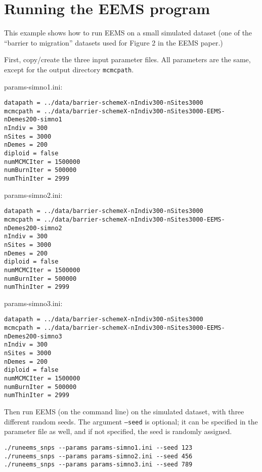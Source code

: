 \documentclass[a4paper,10pt,DIV=15,titlepage,mpinclude=true]{scrartcl}
\newcommand{\keystring}[1]{{\tt #1}}
\begin{document}
\newpage 

\section{Running the EEMS program}\label{sec:running-eems}

This example shows how to run EEMS on a small simulated dataset (one of the ``barrier to migration'' datasets used for Figure 2 in the EEMS paper.)

First, copy/create the three input parameter files. All parameters are the same, except for the output directory \keystring{mcmcpath}.

\bigskip

\noindent params-simno1.ini:
\begin{lstlisting}[style=Cppcode]
datapath = ../data/barrier-schemeX-nIndiv300-nSites3000
mcmcpath = ../data/barrier-schemeX-nIndiv300-nSites3000-EEMS-nDemes200-simno1
nIndiv = 300
nSites = 3000
nDemes = 200
diploid = false
numMCMCIter = 1500000
numBurnIter = 500000
numThinIter = 2999
\end{lstlisting}

\noindent params-simno2.ini:
\begin{lstlisting}[style=Cppcode]
datapath = ../data/barrier-schemeX-nIndiv300-nSites3000
mcmcpath = ../data/barrier-schemeX-nIndiv300-nSites3000-EEMS-nDemes200-simno2
nIndiv = 300
nSites = 3000
nDemes = 200
diploid = false
numMCMCIter = 1500000
numBurnIter = 500000
numThinIter = 2999
\end{lstlisting}

\noindent params-simno3.ini:
\begin{lstlisting}[style=Cppcode]
datapath = ../data/barrier-schemeX-nIndiv300-nSites3000
mcmcpath = ../data/barrier-schemeX-nIndiv300-nSites3000-EEMS-nDemes200-simno3
nIndiv = 300
nSites = 3000
nDemes = 200
diploid = false
numMCMCIter = 1500000
numBurnIter = 500000
numThinIter = 2999
\end{lstlisting}

Then run EEMS (on the command line) on the simulated dataset, with three different random seeds. The argument \keystring{--seed} is optional; it can be specified in the parameter file as well, and if not specified, the seed is randomly assigned.

\begin{lstlisting}[style=Cppcode]
./runeems_snps --params params-simno1.ini --seed 123
./runeems_snps --params params-simno2.ini --seed 456
./runeems_snps --params params-simno3.ini --seed 789
\end{lstlisting}
\end{document}
